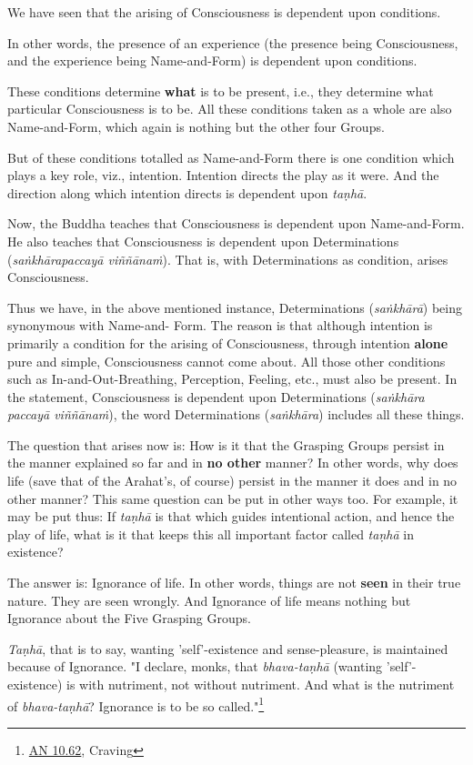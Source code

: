 We have seen that the arising of Consciousness is dependent upon
conditions.


In other words, the presence of an experience (the presence being
Consciousness, and the experience being Name-and-Form) is dependent upon
conditions.


These conditions determine \textbf{what} is to be present, i.e., they determine
what particular Consciousness is to be. All these conditions taken as a
whole are also Name-and-Form, which again is nothing but the other four
Groups.


But of these conditions totalled as Name-and-Form there is one condition
which plays a key role, viz., intention. Intention directs the play as
it were. And the direction along which intention directs is dependent
upon \emph{taṇhā}.


Now, the Buddha teaches that Consciousness is dependent upon
Name-and-Form. He also teaches that Consciousness is dependent upon
Determinations (\emph{saṅkhārapaccayā viññānaṁ}). That is, with
Determinations as condition, arises Consciousness.


Thus we have, in the above mentioned instance, Determinations
(\emph{saṅkhārā}) being synonymous with Name-and- Form. The reason is that
although intention is primarily a condition for the arising of
Consciousness, through intention \textbf{alone} pure and simple, Consciousness
cannot come about. All those other conditions such as
In-and-Out-Breathing, Perception, Feeling, etc., must also be present.
In the statement, Consciousness is dependent upon Determinations
(\emph{saṅkhāra paccayā viññānaṁ}), the word Determinations (\emph{saṅkhāra})
includes all these things.


The question that arises now is: How is it that the Grasping Groups
persist in the manner explained so far and in \textbf{no other} manner? In
other words, why does life (save that of the Arahat’s, of course)
persist in the manner it does and in no other manner? This same question
can be put in other ways too. For example, it may be put thus: If
\emph{taṇhā} is that which guides intentional action, and hence the play of
life, what is it that keeps this all important factor called \emph{taṇhā} in
existence?


The answer is: Ignorance of life. In other words, things are not \textbf{seen}
in their true nature. They are seen wrongly. And Ignorance of life means
nothing but Ignorance about the Five Grasping Groups.


\emph{Taṇhā}, that is to say, wanting 'self'-existence and sense-pleasure,
is maintained because of Ignorance. "I declare, monks, that
\emph{bhava-taṇhā} (wanting 'self'-existence) is with nutriment, not without
nutriment. And what is the nutriment of \emph{bhava-taṇhā}? Ignorance is to
be so called."\footnote{\href{https://suttacentral.net/an10.62/en/bodhi}{AN 10.62}, Craving}


